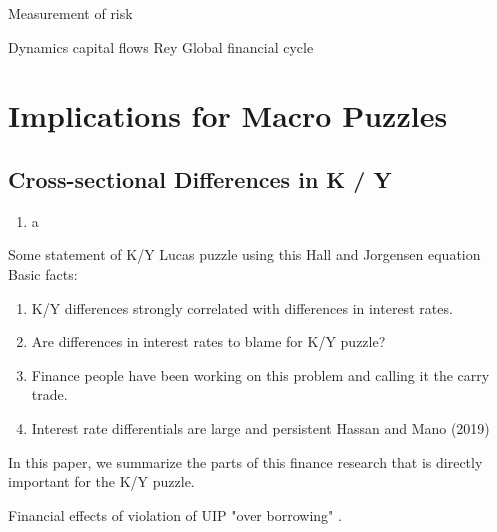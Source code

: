 \documentclass[12pt,letter]{article}
\theoremstyle{break} \theorembodyfont{\normalfont\itshape}
\theoremstyle{break}
\theoremstyle{break} \theorembodyfont{\normalfont\itshape}
\theoremstyle{break} \theorembodyfont{\normalfont\itshape}
\begin{document}
Measurement of risk



Dynamics capital flows
Rey
Global financial cycle





\section{Implications for Macro Puzzles}

\subsection{Cross-sectional Differences in K / Y}
\begin{enumerate}
    \item a
\end{enumerate}
Some statement of K/Y Lucas puzzle using this Hall and Jorgensen equation
Basic facts:
\begin{enumerate}
    \item K/Y differences strongly correlated with differences in interest rates.
    \item Are differences in interest rates to blame for K/Y puzzle?
    \item Finance people have been working on this problem and calling it the carry trade.
    \item Interest rate differentials are large and persistent  Hassan and Mano (2019)
\end{enumerate}
In this paper, we summarize the parts of this finance research that is directly important for the K/Y puzzle.



Financial effects of violation of UIP
"over borrowing"
.
\end{document}

